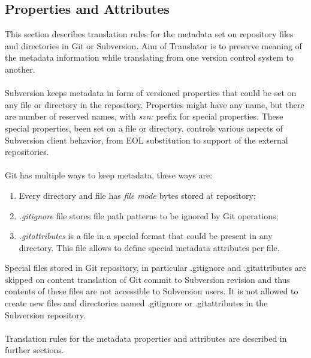 \subsection{Properties and Attributes}
This section describes translation rules for the metadata set on repository files and directories in Git or Subversion.
Aim of Translator is to preserve meaning of the metadata information while translating from one version control system
to another.
\\\\
Subversion keeps metadata in form of versioned properties that could be set on any file or directory in the repository.
Properties might have any name, but there are number of reserved names, with \emph{svn:} prefix for special properties. 
These special properties, been set on a file or directory, controls various aspects of Subversion client behavior, 
from EOL substitution to support of the external repositories.
\\\\
Git has multiple ways to keep metadata, these ways are:
\begin{enumerate}
\compactlist
\item Every directory and file has \emph{file mode} bytes stored at repository;
\item \emph{.gitignore} file stores file path patterns to be ignored by Git operations;
\item \emph{.gitattributes} is a file in a special format that could be present in any directory.
This file allows to define special metadata attributes per file.
\end{enumerate}

Special files stored in Git repository, in particular .gitignore and .gitattributes are skipped
on content translation of Git commit to Subversion revision and thus contents of these files are not 
accessible to Subversion users. It is not allowed to create new files and directories named
.gitignore or .gitattributes in the Subversion repository.
\\\\
Translation rules for the metadata properties and attributes are described in further sections.


